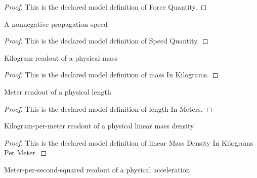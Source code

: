 \begin{proof}
  This is the declared model definition of Force Quantity.
\end{proof}
\begin{definition}
  \label{def:physics:phyx-mini-0188:phyxminiproblems-problemphyxmini0188-speedquantity}
  A nonnegative propagation speed
\end{definition}
\begin{proof}
  This is the declared model definition of Speed Quantity.
\end{proof}
\begin{definition}
  \label{def:physics:phyx-mini-0188:phyxminiproblems-problemphyxmini0188-massinkilograms}
  Kilogram readout of a physical mass
\end{definition}
\begin{proof}
  This is the declared model definition of mass In Kilograms.
\end{proof}
\begin{definition}
  \label{def:physics:phyx-mini-0188:phyxminiproblems-problemphyxmini0188-lengthinmeters}
  Meter readout of a physical length
\end{definition}
\begin{proof}
  This is the declared model definition of length In Meters.
\end{proof}
\begin{definition}
  \label{def:physics:phyx-mini-0188:phyxminiproblems-problemphyxmini0188-linearmassdensityinkilogramspermeter}
  Kilogram-per-meter readout of a physical linear mass density
\end{definition}
\begin{proof}
  This is the declared model definition of linear Mass Density In Kilograms Per Meter.
\end{proof}
\begin{definition}
  \label{def:physics:phyx-mini-0188:phyxminiproblems-problemphyxmini0188-accelerationinmeterspersecondsquared}
  Meter-per-second-squared readout of a physical acceleration
\end{definition}
